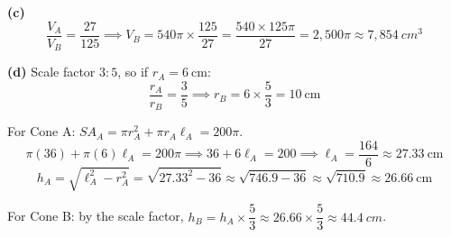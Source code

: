 \documentclass[addpoints]{exam}
\begin{document}
\begin{questions}
\begin{solution}
\textbf{(c)}
\[
\frac{V_A}{V_B} = \frac{27}{125} \implies V_B = 540\pi \times \frac{125}{27} = \frac{540 \times 125\pi}{27} = 2{,}500\pi \approx 7{,}854\ \si{cm^3}
\]

\textbf{(d)} Scale factor $3:5$, so if $r_A = 6\ \text{cm}$:
\[
\frac{r_A}{r_B} = \frac{3}{5} \implies r_B = 6 \times \frac{5}{3} = 10\ \text{cm}
\]

For Cone A: $SA_A = \pi r_A^2 + \pi r_A \ell_A = 200\pi$.
\[
\pi(36) + \pi(6)\ell_A = 200\pi \implies 36 + 6\ell_A = 200 \implies \ell_A = \frac{164}{6} \approx 27.33\ \text{cm}
\]
\[
h_A = \sqrt{\ell_A^2 - r_A^2} = \sqrt{27.33^2 - 36} \approx \sqrt{746.9 - 36} \approx \sqrt{710.9} \approx 26.66\ \text{cm}
\]

For Cone B: by the scale factor, $h_B = h_A \times \dfrac{5}{3} \approx 26.66 \times \dfrac{5}{3} \approx \SI{44.4}{cm}$.
\end{solution}

\end{questions}
\end{document}
